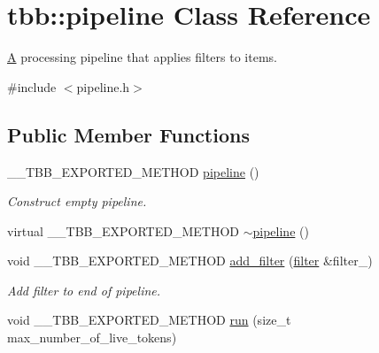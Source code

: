 \hypertarget{classtbb_1_1pipeline}{}\section{tbb\+:\+:pipeline Class Reference}
\label{classtbb_1_1pipeline}


\hyperlink{structA}{A} processing pipeline that applies filters to items.  




{\ttfamily \#include $<$pipeline.\+h$>$}

\subsection*{Public Member Functions}
\begin{DoxyCompactItemize}
\item 
\hypertarget{classtbb_1_1pipeline_aaa607bbf78fd2542355ebee9ee257ae1}{}\+\_\+\+\_\+\+T\+B\+B\+\_\+\+E\+X\+P\+O\+R\+T\+E\+D\+\_\+\+M\+E\+T\+H\+O\+D \hyperlink{classtbb_1_1pipeline_aaa607bbf78fd2542355ebee9ee257ae1}{pipeline} ()\label{classtbb_1_1pipeline_aaa607bbf78fd2542355ebee9ee257ae1}

\begin{DoxyCompactList}\small\item\em Construct empty pipeline. \end{DoxyCompactList}\item 
virtual \+\_\+\+\_\+\+T\+B\+B\+\_\+\+E\+X\+P\+O\+R\+T\+E\+D\+\_\+\+M\+E\+T\+H\+O\+D \hyperlink{classtbb_1_1pipeline_a43f858ac5f66cad39aca62f6e0de7713}{$\sim$pipeline} ()
\item 
\hypertarget{classtbb_1_1pipeline_a17e12af50384a7a70b0a251768dda373}{}void \+\_\+\+\_\+\+T\+B\+B\+\_\+\+E\+X\+P\+O\+R\+T\+E\+D\+\_\+\+M\+E\+T\+H\+O\+D \hyperlink{classtbb_1_1pipeline_a17e12af50384a7a70b0a251768dda373}{add\+\_\+filter} (\hyperlink{classtbb_1_1filter}{filter} \&filter\+\_\+)\label{classtbb_1_1pipeline_a17e12af50384a7a70b0a251768dda373}

\begin{DoxyCompactList}\small\item\em Add filter to end of pipeline. \end{DoxyCompactList}\item 
\hypertarget{classtbb_1_1pipeline_a9dd57c1b58dd2cd3a9b22db10c604726}{}void \+\_\+\+\_\+\+T\+B\+B\+\_\+\+E\+X\+P\+O\+R\+T\+E\+D\+\_\+\+M\+E\+T\+H\+O\+D \hyperlink{classtbb_1_1pipeline_a9dd57c1b58dd2cd3a9b22db10c604726}{run} (size\+\_\+t max\+\_\+number\+\_\+of\+\_\+live\+\_\+tokens)\label{classtbb_1_1pipeline_a9dd57c1b58dd2cd3a9b22db10c604726}


\end{DoxyCompactItemize}
